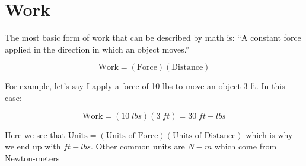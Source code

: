 \section{Work}

\noindent The most basic form of work that can be described by math is:
``A constant force applied in the direction in which an object moves.''

\begin{equation*}
  \text{Work} = (\text{Force})(\text{Distance})
\end{equation*}

\vspace{0.3in}

For example, let's say I apply a force of 10 lbs to move an object
3 ft. In this case:

\begin{equation*}
  \text{Work} = (10 \; lbs)(3 \; ft) = 30 \; ft-lbs
\end{equation*}


Here we see that $\text{Units}=(\text{Units of Force})(\text{Units of Distance})$
which is why we end up with $ft-lbs$. Other common units are $N-m$ which come 
from Newton-meters
